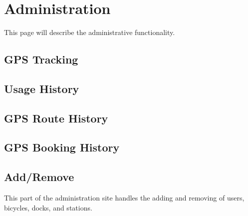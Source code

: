 \section{Administration}
This page will describe the administrative functionality.

\subsection{GPS Tracking}

\subsection{Usage History}

\subsection{GPS Route History}

\subsection{GPS Booking History}

\subsection{Add/Remove}
This part of the administration site handles the adding and removing of users, bicycles, docks, and stations.

